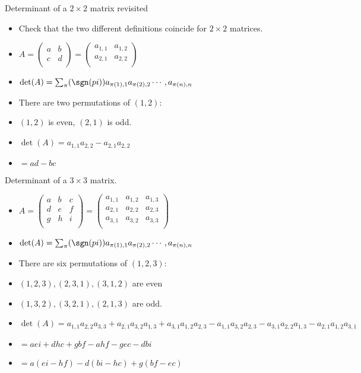 \documentclass[handout]{beamer}
\begin{document}

\begin{frame}{Determinant of a $2\times 2$ matrix revisited}

\begin{itemize}
\item Check that the two different definitions coincide for $2\times 2$ matrices.
\item
$
A=
\begin{pmatrix}
a & b \\
c & d \\
\end{pmatrix}
=
\begin{pmatrix}
a_{1,1} & a_{1,2} \\
a_{2,1} & a_{2,2} \\
\end{pmatrix}
$
\item
$
\det(A) = \sum_{\pi} (\sgn(pi)) a_{\pi(1),1} a_{\pi(2), 2} \cdots, a_{\pi(n), n}
$
\item There are two permutations of $(1,2)$:
\item $(1,2)$ is even, $(2,1)$ is odd.
\item
$
\det(A) = a_{1,1}a_{2,2} - a_{2,1}a_{2,2}
$
\item $= ad-bc$
\end{itemize}
\end{frame}


\begin{frame}{Determinant of a $3\times 3$ matrix.}

\begin{itemize}
\item
$
A=
\begin{pmatrix}
a & b & c\\
d & e & f \\
g & h & i \\
\end{pmatrix}
=
\begin{pmatrix}
a_{1,1} & a_{1,2}  & a_{1,3}\\
a_{2,1} & a_{2,2}  & a_{2,3} \\
a_{3,1} & a_{3,2}  & a_{3,3} \\
\end{pmatrix}
$
\item
$
\det(A) = \sum_{\pi} (\sgn(pi)) a_{\pi(1),1} a_{\pi(2), 2} \cdots, a_{\pi(n), n}
$
\item There are six permutations of $(1,2,3)$:
\item $(1,2,3), (2,3,1), (3,1,2)$ are even
\item $(1,3,2), (3,2,1), (2,1,3)$ are odd.
\item
$
\det(A) = a_{1,1}a_{2,2}a_{3,3}  + a_{2,1}a_{3,2}a_{1,3} + a_{3,1}a_{1,2}a_{2,3}
-a_{1,1}a_{3,2}a_{2,3} -a_{3,1}a_{2,2}a_{1,3} - a_{2,1}a_{1,2}a_{3,1}
$
\item $= aei + dhc + gbf - ahf - gec - dbi$
\item $= a(ei - hf) - d(bi-hc) + g(bf -ec)$
\end{itemize}
\end{frame}
\end{document}
